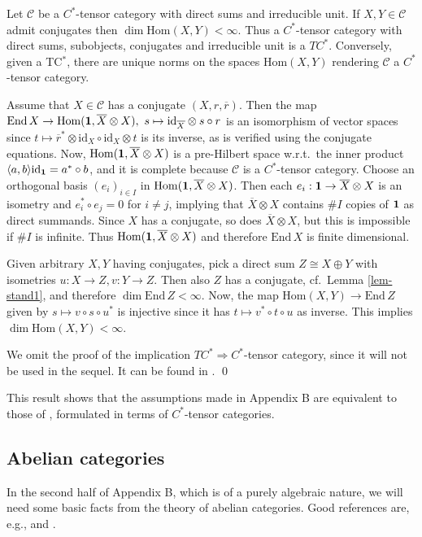 \documentclass[12pt]{article}
\theoremstyle{definition}
\theoremstyle{definition}
\theoremstyle{remark}
\newcommand{\impl}{\Rightarrow}
\def\2#1{{\mathcal #1}}
\def\1#1{{\bf #1}}
\def\ol#1{{\overline #1}}
\newcommand{\Hom}{\mathrm{Hom}}
\newcommand{\End}{\mathrm{End}}
\newcommand{\mcirc}{\circ}
\newcommand{\rarr}{\rightarrow}
\def\id{\mathrm{id}}
\begin{document}
\bprop \cite{LR} Let $\2C$ be a $C^*$-tensor category with direct sums and irreducible unit. If $X,Y\in\2C$
admit conjugates then $\dim\Hom(X,Y)<\infty$. Thus a $C^*$-tensor category with direct sums,
subobjects, conjugates and irreducible unit is a $TC^*$. Conversely, given a TC$^*$, there are
unique norms on the spaces $\Hom(X,Y)$ rendering $\2C$ a $C^*$-tensor category. 
\eprop

\prf Assume that $X\in\2C$ has a conjugate $(X,r,\ol{r})$. Then the map
$\End\,X\rarr\Hom(\11,\ol{X}\otimes X),\ s\mapsto\id_{\ol{X}}\otimes s\mcirc r$ is an isomorphism of
vector spaces since $t\mapsto\ol{r}^*\otimes\id_X\mcirc\id_X\otimes t$ is its inverse, as is
verified using the conjugate equations. Now, $\Hom(\11,\ol{X}\otimes X)$ is a pre-Hilbert space w.r.t.\
the inner product $\langle a,b\rangle\id_\11=a^*\circ b$, and it is complete because $\2C$ is a
$C^*$-tensor category. Choose an orthogonal basis $(e_i)_{i\in I}$ in $\Hom(\11,\ol{X}\otimes X)$.
Then each $e_i:\11\rarr\ol{X}\otimes X$ is an isometry and $e_i^*\circ e_j=0$ for $i\ne j$, implying
that $\ol{X}\otimes X$ contains $\#I$ copies of $\11$ as direct summands. Since $X$ has a conjugate,
so does $\ol{X}\otimes X$, but this is impossible if $\#I$ is infinite. Thus 
$\Hom(\11,\ol{X}\otimes X)$ and therefore $\End\,X$ is finite dimensional.

Given arbitrary $X,Y$ having conjugates, pick a direct sum $Z\cong X\oplus Y$ with isometries
$u:X\rarr Z, v:Y\rarr Z$. Then also $Z$ has a conjugate, cf.\ Lemma \ref{lem-stand1}, and therefore
$\dim\End\,Z<\infty$. Now, the map $\Hom(X,Y)\rarr\End\,Z$ given by $s\mapsto v\circ s\circ u^*$ is
injective since it has $t\mapsto v^*\circ t\circ u$ as inverse. This implies $\dim\Hom(X,Y)<\infty$.

We omit the proof of the implication $TC^*\impl C^*$-tensor category, since it will not be used in
the sequel. It can be found in \cite{mue06}.
\qed

This result shows that the assumptions made in Appendix B are equivalent to those of \cite{DR},
formulated  in terms of $C^*$-tensor categories. 




\subsection{Abelian categories} \label{ss-abelian}
In the second half of Appendix B, which is of a purely algebraic nature, we will need some basic
facts from the theory of abelian categories. Good references are, e.g., \cite{gab} and \cite[Chapter
VIII]{cwm}.
\end{document}
